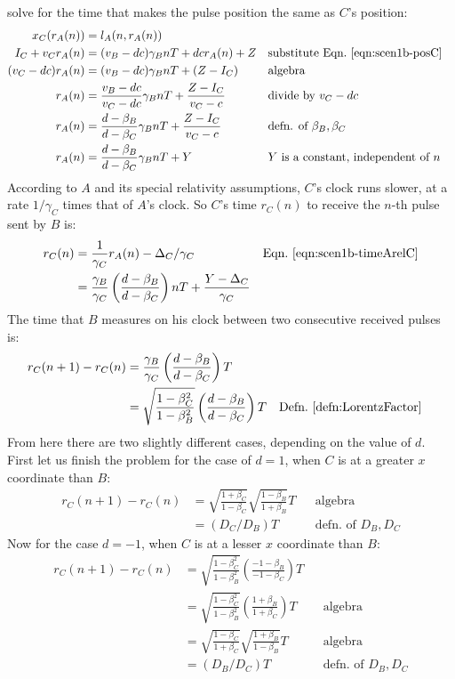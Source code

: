 \documentclass[a4paper]{article}
\theoremstyle{plain}
\theoremstyle{definition}
\begin{document}
solve for the time that makes the pulse position the same as $C$'s position:
\begin{align*}
x_C(r_A(n)) & = l_A(n, r_A(n)) \\
I_C + v_C r_A(n) & = (v_B - dc) \gamma_B nT + dc r_A(n) + Z & & \text{substitute Eqn.~\eqref{eqn:scen1b-posC}} \\
(v_C - dc) r_A(n) & = (v_B - dc) \gamma_B nT + (Z - I_C) & & \text{algebra} \\
r_A(n) & = \frac{v_B - dc}{v_C - dc} \gamma_B nT + \frac{Z - I_C}{v_C - c} & & \text{divide by $v_C-dc$} \\
r_A(n) & = \frac{d - \beta_B}{d -  \beta_C} \gamma_B nT + \frac{Z - I_C}{v_C - c} & & \text{defn. of $\beta_B, \beta_C$} \\
r_A(n) & = \frac{d - \beta_B}{d - \beta_C} \gamma_B nT + Y & & \text{$Y$ is a constant, independent of $n$}
\end{align*}
According to $A$ and its special relativity assumptions,
$C$'s clock runs slower, at a rate $1/\gamma_C$ times that of $A$'s clock.
So $C$'s time $r_C(n)$ to receive the $n$-th pulse sent by $B$ is:
\begin{align*}
r_C(n) & = \frac{1}{\gamma_C} r_A(n) - \Delta_C/\gamma_C & & \text{Eqn.~\eqref{eqn:scen1b-timeArelC}} \\
       & = \frac{\gamma_B}{\gamma_C} \left( \frac{d-\beta_B}{d-\beta_C} \right) nT + \frac{Y-\Delta_C}{\gamma_C}
\end{align*}
The time that $B$ measures on his clock between two consecutive received
pulses is:
\begin{align*}
r_C(n+1) - r_C(n)
  & = \frac{\gamma_B}{\gamma_C} \left( \frac{d-\beta_B}{d-\beta_C} \right) T \\
  & = \sqrt{ \frac{1-\beta_C^2}{1-\beta_B^2} } \left( \frac{d-\beta_B}{d-\beta_C} \right) T & & \text{Defn.~\eqref{defn:LorentzFactor}}
\end{align*}
From here there are two slightly different cases, depending on the
value of $d$.  First let us finish the problem for the case of $d=1$,
when $C$ is at a greater $x$ coordinate than $B$:
\begin{align*}
r_C(n+1) - r_C(n)
  & = \sqrt{ \frac{1+\beta_C}{1-\beta_C} } \sqrt { \frac{1-\beta_B}{1+\beta_B} } T & & \text{algebra} \\
  & = ( D_C / D_B ) T & & \text{defn. of $D_B, D_C$}
\end{align*}
Now for the case $d=-1$, when $C$ is at a lesser $x$ coordinate than
$B$:
\begin{align*}
r_C(n+1) - r_C(n)
  & = \sqrt{ \frac{1-\beta_C^2}{1-\beta_B^2} } \left( \frac{-1-\beta_B}{-1-\beta_C} \right) T \\
  & = \sqrt{ \frac{1-\beta_C^2}{1-\beta_B^2} } \left( \frac{1+\beta_B}{1+\beta_C} \right) T & & \text{algebra} \\
  & = \sqrt{ \frac{1-\beta_C}{1+\beta_C} } \sqrt { \frac{1+\beta_B}{1-\beta_B} } T & & \text{algebra} \\
  & = ( D_B / D_C ) T & & \text{defn. of $D_B, D_C$}
\end{align*}
\end{document}
